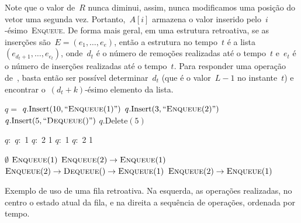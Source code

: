 \documentclass[quali.tex]{subfile}
\begin{document}
Note que o valor de~$R$ nunca diminui, assim, nunca modificamos uma posição do vetor uma segunda vez. Portanto,~$A[i]$ armazena o valor inserido pelo~$i$-ésimo~\textsc{Enqueue}. De forma mais geral, em uma estrutura retroativa, se as inserções são~$E = (e_1, \ldots, e_e)$, então a estrutura no tempo~$t$ é a lista~$(e_{d_t+1}, \ldots, e_{e_t})$, onde~$d_t$ é o número de remoções realizadas até o tempo~$t$ e~$e_t$ é o número de inserções realizadas até o tempo~$t$. Para responder uma operação de~, basta então ser possível determinar~$d_t$ (que é o valor~$L - 1$ no instante~$t$) e encontrar o~$(d_t + k)$-ésimo elemento da lista.

\begin{table}
\centering

\begin{subalgorithm}{0.34\textwidth}
\begin{algorithmic}

	\State $q =$ 
	\State $q.\text{Insert}(10, ``\Call{Enqueue}{1}")$
	\State $q.\text{Insert}(3, ``\Call{Enqueue}{2}")$
	\State $q.\text{Insert}(5, ``\Call{Dequeue}{\null}")$
	\State $q.\text{Delete}(5)$

\end{algorithmic}
\end{subalgorithm} \vrule
\begin{subalgorithm}{0.14\textwidth}
\begin{algorithmic}

	\State $q:$
	\State $q:$ 1
	\State $q:$ 2 1
	\State $q:$ 1
	\State $q:$ 2 1

\end{algorithmic}
\end{subalgorithm} \vrule
\begin{subalgorithm}{0.5\textwidth}
\begin{algorithmic}

	\State $\emptyset$
	\State $\Call{Enqueue}{1}$
	\State $\Call{Enqueue}{2} \rightarrow \Call{Enqueue}{1}$
	\State $\Call{Enqueue}{2} \rightarrow \Call{Dequeue}{\null} \rightarrow \Call{Enqueue}{1}$
	\State $\Call{Enqueue}{2} \rightarrow \Call{Enqueue}{1}$

\end{algorithmic}
\end{subalgorithm}
\caption{Exemplo de uso de uma fila retroativa. Na esquerda, as operações realizadas, no centro o estado atual da fila, e na direita a sequência de operações, ordenada por tempo.} \label{ex:fila_retro}
\end{table}
\end{document}
